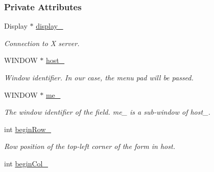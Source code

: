 \subsubsection*{Private Attributes}
\begin{DoxyCompactItemize}
\item 
Display $\ast$ \hyperlink{structslb_1_1core_1_1ui_1_1EditField_ae5f1a7a67b01a99b82810b2a9bb51bd5}{display\+\_\+}\hypertarget{structslb_1_1core_1_1ui_1_1EditField_ae5f1a7a67b01a99b82810b2a9bb51bd5}{}\label{structslb_1_1core_1_1ui_1_1EditField_ae5f1a7a67b01a99b82810b2a9bb51bd5}

\begin{DoxyCompactList}\small\item\em Connection to X server. \end{DoxyCompactList}\item 
W\+I\+N\+D\+OW $\ast$ \hyperlink{structslb_1_1core_1_1ui_1_1EditField_a7b1a0f15e7c53581d51d6b0c4f515133}{host\+\_\+}\hypertarget{structslb_1_1core_1_1ui_1_1EditField_a7b1a0f15e7c53581d51d6b0c4f515133}{}\label{structslb_1_1core_1_1ui_1_1EditField_a7b1a0f15e7c53581d51d6b0c4f515133}

\begin{DoxyCompactList}\small\item\em Window identifier. In our case, the menu pad will be passed. \end{DoxyCompactList}\item 
W\+I\+N\+D\+OW $\ast$ \hyperlink{structslb_1_1core_1_1ui_1_1EditField_af4560765e88c0823dc8ba88d1d5521be}{me\+\_\+}\hypertarget{structslb_1_1core_1_1ui_1_1EditField_af4560765e88c0823dc8ba88d1d5521be}{}\label{structslb_1_1core_1_1ui_1_1EditField_af4560765e88c0823dc8ba88d1d5521be}

\begin{DoxyCompactList}\small\item\em The window identifier of the field. {\ttfamily me\+\_\+} is a sub-\/window of {\ttfamily host\+\_\+}. \end{DoxyCompactList}\item 
int \hyperlink{structslb_1_1core_1_1ui_1_1EditField_ae0acc159579a5d32d6a205b4c7453553}{begin\+Row\+\_\+}\hypertarget{structslb_1_1core_1_1ui_1_1EditField_ae0acc159579a5d32d6a205b4c7453553}{}\label{structslb_1_1core_1_1ui_1_1EditField_ae0acc159579a5d32d6a205b4c7453553}

\begin{DoxyCompactList}\small\item\em Row position of the top-\/left corner of the form in {\ttfamily host}. \end{DoxyCompactList}\item 
int \hyperlink{structslb_1_1core_1_1ui_1_1EditField_ad7d66f086f521d4dbc5265534adb5f3e}{begin\+Col\+\_\+}\hypertarget{structslb_1_1core_1_1ui_1_1EditField_ad7d66f086f521d4dbc5265534adb5f3e}{}\label{structslb_1_1core_1_1ui_1_1EditField_ad7d66f086f521d4dbc5265534adb5f3e}


\end{DoxyCompactItemize}
